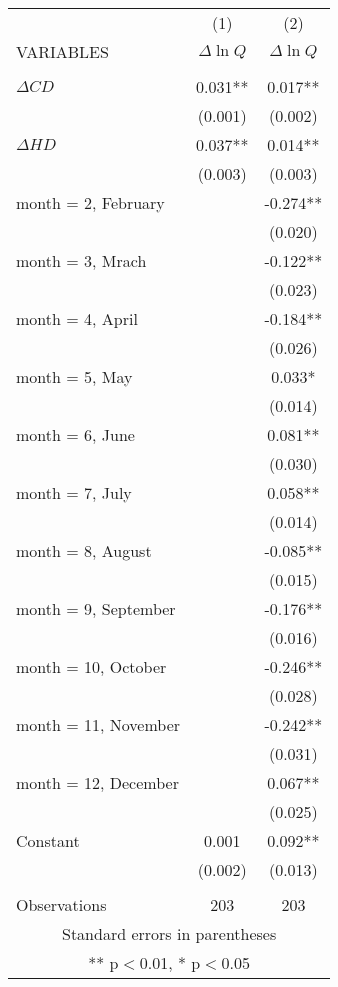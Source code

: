\begin{tabular}{lcc} \hline
 & (1) & (2) \\
VARIABLES & $\Delta \ln Q$ & $\Delta \ln Q$ \\ \hline
 &  &  \\
$\Delta CD$ & 0.031** & 0.017** \\
 & (0.001) & (0.002) \\
$\Delta HD$ & 0.037** & 0.014** \\
 & (0.003) & (0.003) \\
month = 2, February &  & -0.274** \\
 &  & (0.020) \\
month = 3, Mrach &  & -0.122** \\
 &  & (0.023) \\
month = 4, April &  & -0.184** \\
 &  & (0.026) \\
month = 5, May &  & 0.033* \\
 &  & (0.014) \\
month = 6, June &  & 0.081** \\
 &  & (0.030) \\
month = 7, July &  & 0.058** \\
 &  & (0.014) \\
month = 8, August &  & -0.085** \\
 &  & (0.015) \\
month = 9, September &  & -0.176** \\
 &  & (0.016) \\
month = 10, October &  & -0.246** \\
 &  & (0.028) \\
month = 11, November &  & -0.242** \\
 &  & (0.031) \\
month = 12, December &  & 0.067** \\
 &  & (0.025) \\
Constant & 0.001 & 0.092** \\
 & (0.002) & (0.013) \\
 &  &  \\
 Observations & 203 & 203 \\ \hline
\multicolumn{3}{c}{ Standard errors in parentheses} \\
\multicolumn{3}{c}{ ** p$<$0.01, * p$<$0.05} \\
\end{tabular}
